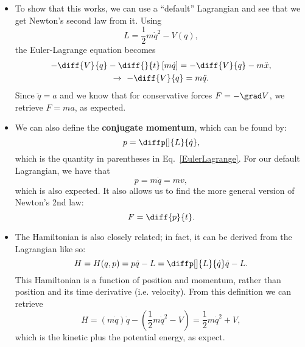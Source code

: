 \begin{itemize}
    \item To show that this works, we can use a ``default'' Lagrangian and see that we get Newton's second law from it. Using 
        \begin{equation*}
            L = \frac{1}{2}m\dot{q}^2 - V(q),
        \end{equation*}
        the Euler-Lagrange equation becomes
        \begin{gather*}
            -\diff{V}{q} - \diff{}{t} \left[m\dot{q}\right] = -\diff{V}{q} - m\ddot{x}, \\
            \rightarrow\ -\diff{V}{q} = m\ddot{q}.
        \end{gather*}
        Since $\ddot{q} = a$ and we know that for conservative forces $F = -\grad V$, we retrieve $F=ma$, as expected.
    \item We can also define the \textbf{conjugate momentum}, which can be found by:
        \begin{equation}
            p = \diffp[]{L}{\dot{q}},
        \end{equation}
        which is the quantity in parentheses in Eq.~\eqref{EulerLagrange}. For our default Lagrangian, we have that
        \begin{equation*}
            p = m\dot{q} = mv,
        \end{equation*}
        which is also expected. It also allows us to find the more general version of Newton's 2nd law:
        \begin{equation*}
            F = \diff{p}{t}.
        \end{equation*}
    \item The Hamiltonian is also closely related; in fact, it can be derived from the Lagrangian like so:
        \begin{equation}
            H = H(q,p) = p\dot{q} - L = \diffp[]{L}{\dot{q}}\dot{q} - L.
        \end{equation}
        This Hamiltonian is a function of position and momentum, rather than position and its time derivative (i.e. velocity). From this definition we can retrieve
        \begin{equation*}
            H = (m\dot{q})\dot{q} - \left(\frac{1}{2}m\dot{q}^2 - V\right) = \frac{1}{2}m\dot{q}^2 + V,
        \end{equation*}
        which is the kinetic plus the potential energy, as expect.
\end{itemize}



